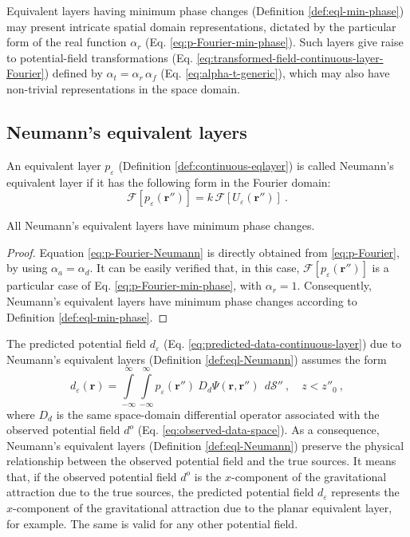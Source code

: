 Equivalent layers having minimum phase changes (Definition \ref{def:eql-min-phase}) may present intricate 
spatial domain representations, dictated by the particular form of the real function $\alpha_{r}$
(Eq. \ref{eq:p-Fourier-min-phase}).
Such layers give raise to potential-field transformations (Eq. \ref{eq:transformed-field-continuous-layer-Fourier})
defined by $\alpha_{t} = \alpha_{r} \, \alpha_{f}$ (Eq. \ref{eq:alpha-t-generic}), which may also
have non-trivial representations in the space domain.

\subsection{Neumann's equivalent layers}

\begin{definition}
	An equivalent layer $p_{\varepsilon}$ (Definition \ref{def:continuous-eqlayer}) is called Neumann's equivalent 
	layer if it has the following form in the Fourier domain:
	\begin{equation}
		\mathcal{F} [ p_{\varepsilon}(\mathbf{r}'') ] =
		k \, \mathcal{F} [ U_{\varepsilon}(\mathbf{r}'') ] \: .
		\label{eq:p-Fourier-Neumann}
	\end{equation}
	\label{def:eql-Neumann}
\end{definition}
\begin{proposition}
	All Neumann's equivalent layers have minimum phase changes.
	\label{prop:eql-Neumann}
\end{proposition}
\begin{proof}
	Equation \ref{eq:p-Fourier-Neumann} is directly obtained from \ref{eq:p-Fourier}, by using 
	$\alpha_{a} = \alpha_{d}$. It can be easily verified that, in this case, 
	$\mathcal{F} [ p_{\varepsilon}(\mathbf{r}'') ]$ is a particular case of Eq. \ref{eq:p-Fourier-min-phase},
	with $\alpha_{r} = 1$. Consequently, Neumann's equivalent layers have minimum phase changes
	according to Definition \ref{def:eql-min-phase}.
\end{proof}

The predicted potential field $d_{\varepsilon}$ (Eq. \ref{eq:predicted-data-continuous-layer}) 
due to Neumann's equivalent layers (Definition \ref{def:eql-Neumann}) assumes the form
\begin{equation}
	d_{\varepsilon}(\mathbf{r})
	= \int\limits_{-\infty}^{\infty}\int\limits_{-\infty}^{\infty}
	p_{\varepsilon}(\mathbf{r}'') \: D_{d} \Psi(\mathbf{r}, \mathbf{r}'') \:\: d\mathcal{S}''
	\: , \quad z < z''_{0} \: ,
	\label{eq:predicted-data-Neumann-layer}
\end{equation}
where $D_{d}$ is the same space-domain differential operator associated with
the observed potential field $d^{o}$ (Eq. \ref{eq:observed-data-space}).
As a consequence, Neumann's equivalent layers (Definition \ref{def:eql-Neumann}) preserve the physical
relationship between the observed potential field and the true sources.
It means that, if the observed potential field $d^{o}$ is the $x$-component of the 
gravitational attraction due to the true sources, the predicted potential field $d_{\varepsilon}$  
represents the $x$-component of the gravitational attraction due to the planar equivalent layer, for example.
The same is valid for any other potential field.

